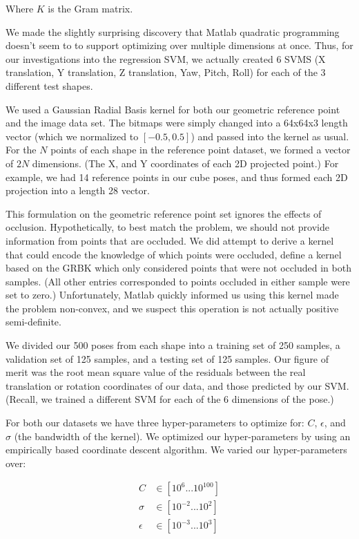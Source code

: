 \documentclass[journal]{IEEEtran}
\begin{document}
\noindent Where $K$ is the Gram matrix.

We made the slightly surprising discovery that Matlab quadratic programming doesn't seem to to support optimizing over multiple dimensions at once. Thus, for our investigations into the regression SVM, we actually created 6 SVMS (X translation, Y translation, Z translation, Yaw, Pitch, Roll) for each of the 3 different test shapes.

We used a Gaussian Radial Basis kernel for both our geometric reference point and the image data set. The bitmaps were simply changed into a 64x64x3 length vector (which we normalized to $[-0.5, 0.5]$) and passed into the kernel as usual. For the $N$ points of each shape in the reference point dataset, we formed a vector of $2N$ dimensions. (The X, and Y coordinates of each 2D projected point.)  For example, we had 14 reference points in our cube poses, and thus formed each 2D projection into a length 28 vector.

This formulation on the geometric reference point set ignores the effects of occlusion. Hypothetically, to best match the problem, we should not provide information from points that are occluded. We did attempt to derive a kernel that could encode the knowledge of which points were occluded, define a kernel based on the GRBK which only considered points that were not occluded in both samples. (All other entries corresponded to points occluded in either sample were set to zero.)
Unfortunately, Matlab quickly informed us using this kernel made the problem non-convex, and we suspect this operation is not actually positive semi-definite.

We divided our 500 poses from each shape into a training set of 250 samples, a validation set of 125 samples, and a testing set of 125 samples. Our figure of merit was the root mean square value of the residuals between the real translation or rotation coordinates of our data, and those predicted by our SVM. (Recall, we trained a different SVM for each of the 6 dimensions of the pose.)

For both our datasets we have three hyper-parameters to optimize for: $C$, $\epsilon$, and $\sigma$ (the bandwidth of the kernel). We optimized our hyper-parameters by using an empirically based coordinate descent algorithm. We varied our hyper-parameters over:

\begin{align*}
C &\in [10^{6} ... 10^{100}]\\
\sigma &\in [10^{-2} ... 10^{2}]\\
\epsilon &\in [10^{-3} ... 10^{3}]
\end{align*}
\end{document}
